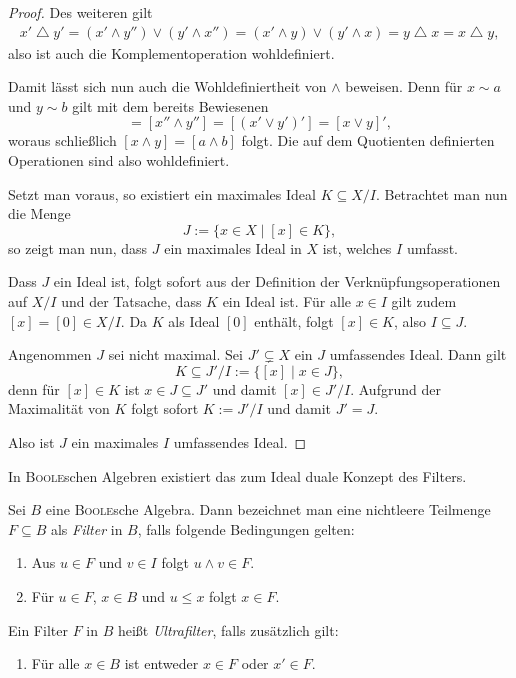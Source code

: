 \begin{proof}
  Des weiteren gilt
  \begin{align*}
    x' \bigtriangleup y'
    = (x' \land y'') \lor (y' \land x'')
    = (x' \land y) \lor (y' \land x)
    = y \bigtriangleup x
    = x \bigtriangleup y,
  \end{align*}
  also ist auch die Komplementoperation wohldefiniert.

  Damit lässt sich nun auch die Wohldefiniertheit von $\land$ beweisen.
  Denn für $x \sim a$ und $y \sim b$ gilt mit dem bereits Bewiesenen
  \begin{displaymath}
    [x \land y]
    = [x'' \land y'']
    = [(x' \lor y')']
    = [x \lor y]',
  \end{displaymath}
  woraus schließlich $[x \land y] = [a \land b]$ folgt.
  Die auf dem Quotienten definierten Operationen sind also wohldefiniert.

  Setzt man \PIT voraus, so existiert ein maximales Ideal $K \subseteq X/I$.
  Betrachtet man nun die Menge
  \begin{displaymath}
    J := \{x \in X \mid [x] \in K\},
  \end{displaymath}
  so zeigt man nun, dass $J$ ein maximales Ideal in $X$ ist, welches $I$ umfasst.
  
  Dass $J$ ein Ideal ist, folgt sofort aus der Definition der Verknüpfungsoperationen auf $X/I$ und der Tatsache, dass $K$ ein Ideal ist.
  Für alle $x \in I$ gilt zudem $[x] = [0] \in X/I$. 
  Da $K$ als Ideal $[0]$ enthält, folgt $[x] \in K$, also $I \subseteq J$.
  
  Angenommen $J$ sei nicht maximal. Sei $J' \subsetneq X$ ein $J$ umfassendes Ideal.
  Dann gilt 
  \begin{displaymath}
    K \subseteq J'/I := \{[x] \mid x \in J\},
  \end{displaymath}
  denn für $[x] \in K$ ist $x \in J \subseteq J'$ und damit $[x] \in J'/I$.
  Aufgrund der Maximalität von $K$ folgt sofort $K := J'/I$ und damit $J' = J$.

  Also ist $J$ ein maximales $I$ umfassendes Ideal.
\end{proof}

In \textsc{Boole}schen Algebren existiert das zum Ideal duale Konzept des Filters. 

\begin{defn}
  Sei $B$ eine \textsc{Boole}sche Algebra. Dann bezeichnet man eine nichtleere Teilmenge $F \subseteq B$ als \textit{Filter} in $B$, falls folgende Bedingungen gelten:
  \begin{enumerate}[(1)]
    \item Aus $u \in F$ und $v \in I$ folgt $u \land v \in F$.
    \item Für $u \in F$, $x \in B$ und $u \leq x$ folgt  $x \in F$.
  \end{enumerate}
  Ein Filter $F$ in $B$ heißt \textit{Ultrafilter}, falls zusätzlich gilt:
  \begin{enumerate}[(3)]
    \item Für alle $x \in B$ ist entweder $x \in F$ oder $x' \in F$.
  \end{enumerate}
\end{defn}

